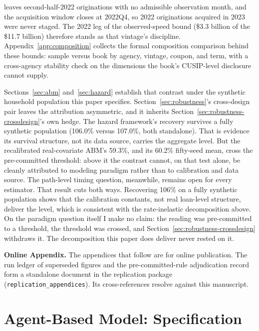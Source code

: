 \documentclass[12pt]{article}
\begin{document}
leaves second-half-2022 originations with no admissible observation month, and the acquisition window closes at 2022Q4, so 2022 originations acquired in 2023 were never staged. The 2022 leg of the observed-speed bound (\$3.3 billion of the \$11.7 billion) therefore stands as that vintage's discipline. Appendix~\ref{app:composition} collects the formal composition comparison behind these bounds: sample versus book by agency, vintage, coupon, and term, with a cross-agency stability check on the dimensions the book's CUSIP-level disclosure cannot supply.

Sections~\ref{sec:abm} and~\ref{sec:hazard} establish that contrast under the synthetic household population this paper specifies. Section~\ref{sec:robustness}'s cross-design pair leaves the attribution asymmetric, and it inherits Section~\ref{sec:robustness-crossdesign}'s own hedge. The hazard framework's recovery survives a fully synthetic population (106.0\% versus 107.0\%, both standalone). That is evidence its survival structure, not its data source, carries the aggregate level. But the recalibrated real-covariate ABM's 59.3\%, and its 60.2\% fifty-seed mean, cross the pre-committed threshold: above it the contrast cannot, on that test alone, be cleanly attributed to modeling paradigm rather than to calibration and data source. The path-level timing question, meanwhile, remains open for every estimator. That result cuts both ways. Recovering 106\% on a fully synthetic population shows that the calibration constants, not real loan-level structure, deliver the level, which is consistent with the rate-inelastic decomposition above. On the paradigm question itself I make no claim: the reading was pre-committed to a threshold, the threshold was crossed, and Section~\ref{sec:robustness-crossdesign} withdraws it. The decomposition this paper does deliver never rested on it.

\clearpage



\clearpage
\appendix

\noindent\textbf{Online Appendix.} The appendices that follow are for online publication. The run ledger of superseded figures and the pre-committed-rule adjudication record form a standalone document in the replication package (\texttt{replication\_appendices}). Its cross-references resolve against this manuscript.

\section{Agent-Based Model: Specification}\label{sec:method-abm}
\end{document}
